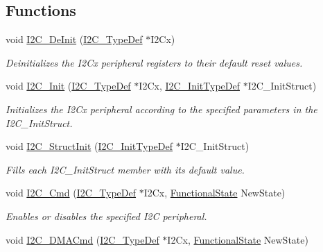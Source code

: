 \subsection*{Functions}
\begin{DoxyCompactItemize}
\item 
void \hyperlink{group___i2_c___exported___functions_ga2ee214364603059ad5d9089f749f5bfd}{I2\+C\+\_\+\+De\+Init} (\hyperlink{struct_i2_c___type_def}{I2\+C\+\_\+\+Type\+Def} $\ast$I2\+Cx)
\begin{DoxyCompactList}\small\item\em Deinitializes the I2\+Cx peripheral registers to their default reset values. \end{DoxyCompactList}\item 
void \hyperlink{group___i2_c___exported___functions_gaac29465bca70fbc91c2f922ab67bb88e}{I2\+C\+\_\+\+Init} (\hyperlink{struct_i2_c___type_def}{I2\+C\+\_\+\+Type\+Def} $\ast$I2\+Cx, \hyperlink{struct_i2_c___init_type_def}{I2\+C\+\_\+\+Init\+Type\+Def} $\ast$I2\+C\+\_\+\+Init\+Struct)
\begin{DoxyCompactList}\small\item\em Initializes the I2\+Cx peripheral according to the specified parameters in the I2\+C\+\_\+\+Init\+Struct. \end{DoxyCompactList}\item 
void \hyperlink{group___i2_c___exported___functions_ga08582aca6d7d7910cd5cbff0d9def350}{I2\+C\+\_\+\+Struct\+Init} (\hyperlink{struct_i2_c___init_type_def}{I2\+C\+\_\+\+Init\+Type\+Def} $\ast$I2\+C\+\_\+\+Init\+Struct)
\begin{DoxyCompactList}\small\item\em Fills each I2\+C\+\_\+\+Init\+Struct member with its default value. \end{DoxyCompactList}\item 
void \hyperlink{group___i2_c___exported___functions_ga7e1323c9133c2cb424dfb5b10b7d2f0b}{I2\+C\+\_\+\+Cmd} (\hyperlink{struct_i2_c___type_def}{I2\+C\+\_\+\+Type\+Def} $\ast$I2\+Cx, \hyperlink{group___exported__types_gac9a7e9a35d2513ec15c3b537aaa4fba1}{Functional\+State} New\+State)
\begin{DoxyCompactList}\small\item\em Enables or disables the specified I2C peripheral. \end{DoxyCompactList}\item 
void \hyperlink{group___i2_c___exported___functions_ga38502ce11e5ec923e0f6476aaa35b45c}{I2\+C\+\_\+\+D\+M\+A\+Cmd} (\hyperlink{struct_i2_c___type_def}{I2\+C\+\_\+\+Type\+Def} $\ast$I2\+Cx, \hyperlink{group___exported__types_gac9a7e9a35d2513ec15c3b537aaa4fba1}{Functional\+State} New\+State)

\end{DoxyCompactItemize}
